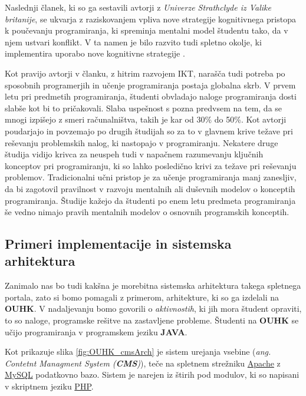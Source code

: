 
Naslednji članek, ki so ga sestavili avtorji z \emph{Univerze
  Strathclyde iz Valike britanije}, se ukvarja z raziskovanjem vpliva
nove strategije kognitivnega pristopa k poučevanju programiranja, ki
spreminja mentalni model študentu tako, da v njem ustvari konflikt. V
ta namen je bilo razvito tudi spletno okolje, ki implementira uporabo
nove kognitivne strategije \cite{mentalModels}.


Kot pravijo avtorji v članku, z hitrim razvojem IKT, narašča tudi
potreba po sposobnih programerjih in učenje programiranja postaja
globalna skrb. V prvem letu pri predmetih programiranja, študenti
obvladajo naloge programiranja dosti slabše kot bi to
pričakovali. Slaba uspešnost s pozna predvsem na tem, da se mnogi
izpišejo z smeri računalništva, takih je kar od 30\% do 50\%. Kot
avtorji poudarjajo in povzemajo po drugih študijah so za to v glavnem
krive težave pri reševanju problemskih nalog, ki nastopajo v
programiranju. Nekatere druge študija vidijo krivca za neuspeh tudi v
napačnem razumevanju ključnih konceptov pri programiranju, ki so lahko
posledično krivi za težave pri reševanju problemov. Tradicionalni učni
pristop je za učenje programiranja manj zanesljiv, da bi zagotovil
pravilnost v razvoju mentalnih ali duševnih modelov o
konceptih programiranja. Študije kažejo da študenti po enem letu
predmeta programiranja še vedno nimajo pravih mentalnih modelov o
osnovnih programskih konceptih.

\subsection{Primeri implementacije in sistemska arhitektura}
\label{sec:sistemska_arhitektura_All}

Zanimalo nas bo tudi kakšna je morebitna sistemska arhitektura takega
spletnega portala, zato si bomo pomagali z primerom, arhitekture, ki
so ga izdelali na \textbf{OUHK}.  V nadaljevanju bomo govorili o
\emph{aktivnostih}, ki jih mora študent opraviti, to so naloge,
programske rešitve na zastavljene probleme. Študenti na \textbf{OUHK}
se učijo programiranja v programskem jeziku \textbf{JAVA}.

Kot prikazuje slika \ref{fig:OUHK_cmsArch} je sistem urejanja vsebine
(\emph{ang. Contetnt Managment System (\textbf{CMS})}), teče na
spletnem strežniku \href{http://www.apache.org/}{Apache} z
\href{https://www.mysql.com/}{MySQL} podatkovno bazo. Sistem je
narejen iz štirih pod modulov, ki so napisani v skriptnem jeziku
\href{http://php.net/}{PHP}.

